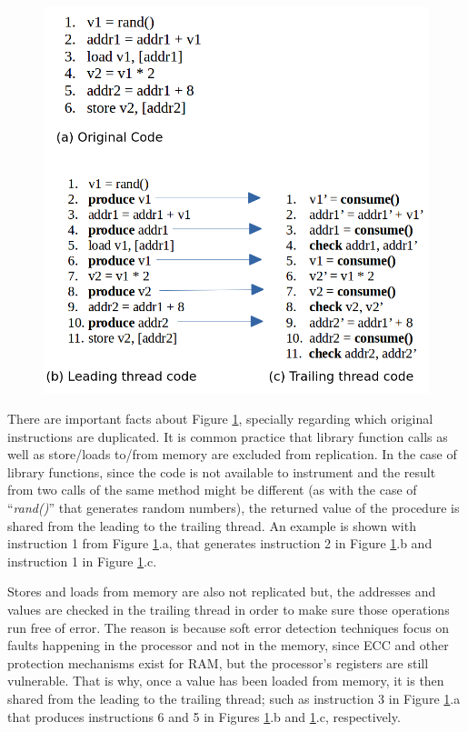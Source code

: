 \begin{figure}[h]
	\centering
	\includegraphics[height=0.5\textheight]{images/CodeTransformation.png}
	\label{fig:CodeTransformationWithRMT}
\end{figure}

There are important facts about Figure \ref{fig:CodeTransformationWithRMT}, specially regarding which original instructions are duplicated. It is common practice \cite{mitropoulou2016comet} \cite{wang2007compiler} \cite{zhang2012daft} that library function calls as well as store/loads to/from memory are excluded from replication. In the case of library functions, since the code is not available to instrument and the result from two calls of the same method might be different (as with the case of ``\textit{rand()}'' that generates random numbers), the returned value of the procedure is shared from the leading to the trailing thread. An example is shown with instruction 1 from Figure \ref{fig:CodeTransformationWithRMT}.a, that generates instruction 2 in Figure \ref{fig:CodeTransformationWithRMT}.b and instruction 1 in Figure \ref{fig:CodeTransformationWithRMT}.c. 

Stores and loads from memory are also not replicated but, the addresses and values are checked in the trailing thread in order to make sure those operations run free of error. The reason is because soft error detection techniques focus on faults happening in the processor and not in the memory, since ECC and other protection mechanisms exist for RAM, but the processor's registers are still vulnerable. That is why, once a value has been loaded from memory, it is then shared from the leading to the trailing thread; such as instruction 3 in Figure \ref{fig:CodeTransformationWithRMT}.a that produces instructions 6 and 5 in Figures \ref{fig:CodeTransformationWithRMT}.b and \ref{fig:CodeTransformationWithRMT}.c, respectively. 

